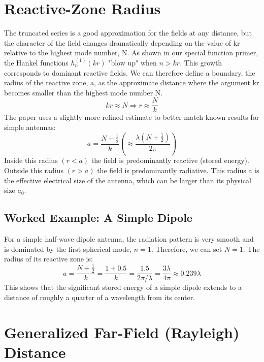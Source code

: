 \documentclass[11pt,a4paper]{article}
\begin{document}
\section{Reactive-Zone Radius}

The truncated series is a good approximation for the fields at any distance, but the character of the field changes dramatically depending on the value of kr relative to the highest mode number, N. As shown in our special function primer, the Hankel functions \(h_{n}^{(1)}(kr)\) "blow up" when \(n>kr\). This growth corresponds to dominant reactive fields.
We can therefore define a boundary, the radius of the reactive zone, a, as the approximate distance where the argument kr becomes smaller than the highest mode number N.
\begin{equation}
    kr\approx N \Rightarrow r\approx\frac{N}{k}
\end{equation}
The paper uses a slightly more refined estimate to better match known results for simple antennas:
\begin{equation}
    a=\frac{N+\frac{1}{2}}{k} \left(\approx\frac{\lambda(N+\frac{1}{2})}{2\pi}\right)
\end{equation}
Inside this radius \((r<a)\) the field is predominantly reactive (stored energy). Outside this radius \((r>a)\) the field is predominantly radiative. This radius a is the effective electrical size of the antenna, which can be larger than its physical size \(a_{0}\).

\subsection{Worked Example: A Simple Dipole}

For a simple half-wave dipole antenna, the radiation pattern is very smooth and is dominated by the first spherical mode, \(n=1\). Therefore, we can set \(N=1\). The radius of its reactive zone is:
\begin{equation}
    a=\frac{N+\frac{1}{2}}{k}=\frac{1+0.5}{k}=\frac{1.5}{2\pi/\lambda}=\frac{3\lambda}{4\pi}\approx0.239\lambda
\end{equation}
This shows that the significant stored energy of a simple dipole extends to a distance of roughly a quarter of a wavelength from its center.

\section{Generalized Far-Field (Rayleigh) Distance}
\end{document}
